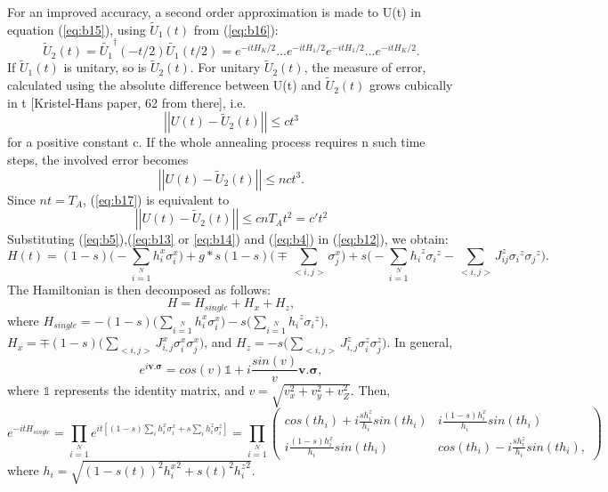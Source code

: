 \documentclass[../main.tex]{subfiles}
\begin{document}
For an improved accuracy, a second order approximation is made to U(t) in equation (\ref{eq:b15}), using $\tilde{U}_1(t)$ from (\ref{eq:b16}):
\begin{equation}
\tilde{U}_2(t)=\tilde{U_1}^{\dagger}(-t/2)\tilde{U_1}(t/2)=e^{-itH_K/2}...e^{-itH_1/2}e^{-itH_1/2}...e^{-itH_K/2}.
\end{equation}
If $\tilde{U}_1(t)$ is unitary, so is $\tilde{U}_2(t)$. For unitary $\tilde{U}_2(t)$, the measure of error, calculated using the absolute difference between U(t) and $\tilde{U}_2(t)$ grows cubically in t [Kristel-Hans paper, 62 from there], i.e.
\begin{equation}
\left| \left| U(t)-\tilde{U}_2(t) \right| \right| \leq ct^3    
\end{equation} 
for a positive constant c. If the whole annealing process requires n such time steps, the involved error becomes
\begin{equation}
\left| \left| U(t)-\tilde{U}_2(t) \right| \right| \leq nct^3.  \label{eq:b17}
\end{equation}
Since $nt=T_A$, (\ref{eq:b17}) is equivalent to
\begin{equation}
\left| \left| U(t)-\tilde{U}_2(t) \right| \right| \leq cnT_At^2 = c't^2 \label{eq:b18}
\end{equation}
Substituting (\ref{eq:b5}),(\ref{eq:b13} or \ref{eq:b14}) and (\ref{eq:b4}) in (\ref{eq:b12}), we obtain:
\begin{equation}
H(t)=(1-s)\Big(-\sum \limits_{i=1}\limits^N h_i^x \sigma_i^x \Big)+g*s(1-s)\Big(\mp \sum \limits_{<i,j>}\sigma_{j}^x\Big) +s \Big(-\sum\limits_{i=1}\limits^{N}{h_i}^z{\sigma_i}^z - \sum\limits_{<i,j>}{J_{ij}^z} {\sigma_i}^z{\sigma_j}^z \Big).  \label{eq:b19}
\end{equation}
The Hamiltonian is then decomposed as follows:
\begin{equation}
H=H_{single}+H_x+H_z, \label{eq:b20}
\end{equation}
where $H_{single}=-(1-s)\Big(\sum \limits_{i=1}\limits^N h_i^x \sigma_i^x \Big)-s\Big(\sum\limits_{i=1}\limits^{N}{h_i}^z{\sigma_i}^z \Big)$, $H_x= \mp (1-s) \Big( \sum \limits_{<i,j>} J_{i,j}^x \sigma_{i}^x \sigma_{j}^x \Big)$, and $H_z= -s \Big(\sum \limits_{<i,j>} J_{i,j}^z \sigma_{i}^z\sigma_{j}^z\Big )$. In general, 
\begin{equation}
e^{i \mathbf{v.\sigma}}=cos(v) \mathbb{1} +i \frac{sin(v)}{v}\mathbf{v.\sigma},
\end{equation}
where $\mathbb{1}$ represents the identity matrix, and $v=\sqrt{v_x^2 +v_y^2 +v_Z^2}$. Then, 
\begin{equation}
e^{-itH_{single}}=\prod \limits_{i=1} \limits^{N} e^{it[(1-s)\sum \limits_i h_i^x \sigma_i^x +s \sum \limits_{i} h_i^z \sigma_i^z]} = \prod \limits_{i=1} \limits^{N} \begin{pmatrix}
cos(th_i) +i \frac{sh_i^z}{h_i} sin(th_i) &  i \frac{(1-s)h_i^x}{h_i} sin(th_i)\\
i \frac{(1-s)h_i^x}{h_i}sin(th_i) & cos(th_i) -i \frac{sh_i^z}{h_i} sin(th_i),
\end{pmatrix}
\end{equation}
where $h_i=\sqrt{(1-s(t))^2 {h_i^x}^2 + s(t)^2 {h_i^z}^2}$.\\
\end{document}
